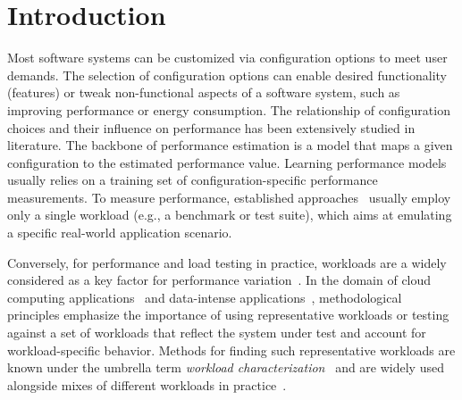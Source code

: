 \section{Introduction}
Most software systems can be customized via configuration options to meet user demands. The selection of configuration options can enable desired functionality (features) or tweak non-functional aspects of a software system, such as improving performance or energy consumption. 
The relationship of configuration choices and their influence on performance has been extensively studied in literature.
The backbone of performance estimation is a model that maps a given configuration to the estimated performance value. 
Learning performance models usually relies on a training set of configuration-specific performance measurements. 
To measure performance, established approaches~\cite{dorn2020,siegmundPerformanceinfluenceModelsHighly2015,haDeepPerf2019,perfAL,guoVariabilityawarePerformancePrediction2013,sarkarCostEfficientSamplingPerformance,guo_2018_data,fourier_learning_2015,perLasso} usually employ only a single workload (e.g., a benchmark or test suite), which aims at emulating a specific real-world application scenario.

Conversely, for performance and load testing in practice, workloads are a widely considered as a key factor for performance variation~\cite{ceesay2020,papadopoulos2021}.
In the domain of cloud computing applications~\cite{papadopoulos2021} and data-intense applications~\cite{ceesay2020}, methodological principles emphasize the importance of using representative workloads or testing against a set of workloads that reflect the system under test and account for workload-specific behavior. Methods for finding such representative workloads are known under the umbrella term \emph{workload characterization}~\cite{calzarossa2016} and are widely used alongside mixes of different workloads in practice~\cite{jiang2015survey}. 


